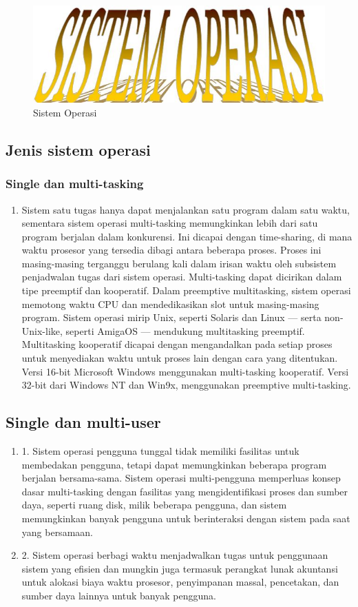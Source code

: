 	\begin{figure}[ht]
		\centerline{\includegraphics[width=1\textwidth]{figures/OS.JPG}}
		\caption{Sistem Operasi}
		\label{OS}
	\end{figure}

\subsection{Jenis sistem operasi}
\subsubsection{Single dan multi-tasking}
	\begin{enumerate}
		\item Sistem satu tugas hanya dapat menjalankan satu program dalam satu waktu, sementara sistem operasi multi-tasking memungkinkan lebih dari satu program berjalan dalam konkurensi. Ini dicapai dengan time-sharing, di mana waktu prosesor yang tersedia dibagi antara beberapa proses. Proses ini masing-masing terganggu berulang kali dalam irisan waktu oleh subsistem penjadwalan tugas dari sistem operasi. Multi-tasking dapat dicirikan dalam tipe preemptif dan kooperatif. Dalam preemptive multitasking, sistem operasi memotong waktu CPU dan mendedikasikan slot untuk masing-masing program. Sistem operasi mirip Unix, seperti Solaris dan Linux — serta non-Unix-like, seperti AmigaOS — mendukung multitasking preemptif. Multitasking kooperatif dicapai dengan mengandalkan pada setiap proses untuk menyediakan waktu untuk proses lain dengan cara yang ditentukan. Versi 16-bit Microsoft Windows menggunakan multi-tasking kooperatif. Versi 32-bit dari Windows NT dan Win9x, menggunakan preemptive multi-tasking.
	\end{enumerate}
\subsection{Single dan multi-user}
	\begin{enumerate}
		\item 1. Sistem operasi pengguna tunggal tidak memiliki fasilitas untuk membedakan pengguna, tetapi dapat memungkinkan beberapa program berjalan bersama-sama. Sistem operasi multi-pengguna memperluas konsep dasar multi-tasking dengan fasilitas yang mengidentifikasi proses dan sumber daya, seperti ruang disk, milik beberapa pengguna, dan sistem memungkinkan banyak pengguna untuk berinteraksi dengan sistem pada saat yang bersamaan. 
		\item 2. Sistem operasi berbagi waktu menjadwalkan tugas untuk penggunaan sistem yang efisien dan mungkin juga termasuk perangkat lunak akuntansi untuk alokasi biaya waktu prosesor, penyimpanan massal, pencetakan, dan sumber daya lainnya untuk banyak pengguna.
	\end{enumerate}
